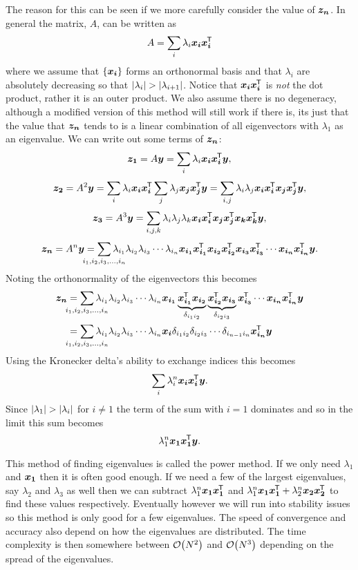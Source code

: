 \documentclass[a4paper]{article}
\begin{document}
    The reason for this can be seen if we more carefully consider the value of \(\bm{z_n}\).
    In general the matrix, \(A\), can be written as
    \[A = \sum_i\lambda_i\bm{x_i}\bm{x_i}^{\mkern-1.5mu\mathsf{T}}\]
    where we assume that \(\{\bm{x_i}\}\) forms an orthonormal basis and that \(\lambda_i\) are absolutely decreasing so that
    \(\abs{\lambda_{i}} > \abs{\lambda_{i+1}}\).
    Notice that \(\bm{x_i}\bm{x_i}^{\mkern-1.5mu\mathsf{T}}\) is \emph{not} the dot product, rather it is an outer product.
    We also assume there is no degeneracy, although a modified version of this method will still work if there is, its just that the value that \(\bm{z_n}\) tends to is a linear combination of all eigenvectors with \(\lambda_1\) as an eigenvalue.
    We can write out some terms of \(\bm{z_n}\):
    \[\bm{z_1} = A\bm{y} = \sum_{i}\lambda_i\bm{x_i}\bm{x_i}^{\mkern-1.5mu\mathsf{T}}\bm{y},\]
    \[\bm{z_2} = A^2\bm{y} = \sum_{i}\lambda_i\bm{x_i}\bm{x_i}^{\mkern-1.5mu\mathsf{T}}\sum_{j}\lambda_j\bm{x_j}\bm{x_j}^{\mkern-1.5mu\mathsf{T}}\bm{y} = \sum_{i,j}\lambda_i\lambda_j\bm{x_i}\bm{x_i}^{\mkern-1.5mu\mathsf{T}} \bm{x_j}\bm{x_j}^{\mkern-1.5mu\mathsf{T}}\bm{y},\]
    \[\bm{z_3} = A^3\bm{y} = \sum_{i,j,k}\lambda_i\lambda_j\lambda_k\bm{x_i}\bm{x_i}^{\mkern-1.5mu\mathsf{T}} \bm{x_j}\bm{x_j}^{\mkern-1.5mu\mathsf{T}}\bm{x_k}\bm{x_k}^{\mkern-1.5mu\mathsf{T}}\bm{y},\]
    \[\vv{z_n} = A^n\vv{y} = \sum_{\mathclap{i_1,i_2,i_3,\dotsc,i_n}}\lambda_{i_1}\lambda_{i_2}\lambda_{i_3}\dotsm\lambda_{i_n}\vv{x_{i_1}}\vv{x_{i_1}}\trans \vv{x_{i_2}}\vv{x_{i_2}}\trans\vv{x_{i_3}}\vv{x_{i_3}}\trans\dotsm\vv{x_{i_n}}\vv{x_{i_n}}\trans\vv{y}.\]
    Noting the orthonormality of the eigenvectors this becomes
    \begin{align*}
        \vv{z_n} &=  \sum_{\mathclap{i_1,i_2,i_3,\dotsc,i_n}} \lambda_{i_1}\lambda_{i_2}\lambda_{i_3}\dotsm\lambda_{i_n}\vv{x_{i_1}}\underbrace{\vv{x_{i_1}}\trans \vv{x_{i_2}}}_{\delta_{i_1i_2}}\underbrace{\vv{x_{i_2}}\trans\vv{x_{i_3}}}_{\delta_{i_2i_3}}\vv{x_{i_3}}\trans\dotsm\vv{x_{i_n}}\vv{x_{i_n}}\trans\vv{y}\\
        &= \sum_{\mathclap{i_1,i_2,i_3,\dotsc,i_n}} \lambda_{i_1}\lambda_{i_2}\lambda_{i_3}\dotsm\lambda_{i_n} \vv{x_i}\delta_{i_1i_2}\delta_{i_2i_3}\dotsm\delta_{i_{n-1}i_n}\vv{x_{i_n}}\trans\vv{y}
    \end{align*}
    Using the Kronecker delta's ability to exchange indices this becomes
    \[\sum_{i} \lambda_i^n\bm{x_i}\bm{x_i}^{\mkern-1.5mu\mathsf{T}}\bm{y}.\]
    Since \(\abs{\lambda_1} > \abs{\lambda_i}\) for \(i\ne 1\) the term of the sum with \(i = 1\) dominates and so in the limit this sum becomes
    \[\lambda_1^n\bm{x_1}\bm{x_1}^{\mkern-1.5mu\mathsf{T}}\bm{y}.\]
    
    This method of finding eigenvalues is called the power method.
    If we only need \(\lambda_1\) and \(\bm{x_1}\) then it is often good enough.
    If we need a few of the largest eigenvalues, say \(\lambda_2\) and \(\lambda_3\) as well then we can subtract \(\lambda_1^n\bm{x_1}\bm{x_1}^{\mkern-1.5mu\mathsf{T}}\) and \(\lambda_1^n\bm{x_1}\bm{x_1}^{\mkern-1.5mu\mathsf{T}} + \lambda_2^n\bm{x_2}\bm{x_2}^{\mkern-1.5mu\mathsf{T}}\) to find these values respectively.
    Eventually however we will run into stability issues so this method is only good for a few eigenvalues.
    The speed of convergence and accuracy also depend on how the eigenvalues are distributed.
    The time complexity is then somewhere between \(\order{N^2}\) and \(\order{N^3}\) depending on the spread of the eigenvalues.
    
\end{document}
